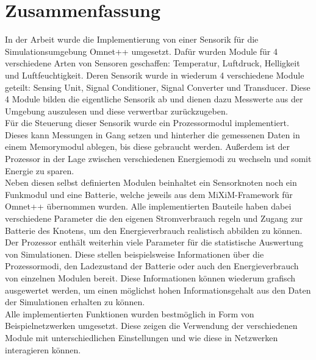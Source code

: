 \chapter{Zusammenfassung}

In der Arbeit wurde die Implementierung von einer Sensorik für die Simulationsumgebung Omnet++ umgesetzt. Dafür wurden Module für 4 verschiedene Arten von Sensoren geschaffen: Temperatur, Luftdruck, Helligkeit und Luftfeuchtigkeit. Deren Sensorik wurde in wiederum 4 verschiedene Module geteilt: Sensing Unit, Signal Conditioner, Signal Converter und Transducer. Diese 4 Module bilden die eigentliche Sensorik ab und dienen dazu Messwerte aus der Umgebung auszulesen und diese verwertbar zurückzugeben.\\
Für die Steuerung dieser Sensorik wurde ein Prozessormodul implementiert. Dieses kann Messungen in Gang setzen und hinterher die gemessenen Daten in einem Memorymodul ablegen, bis diese gebraucht werden. Außerdem ist der Prozessor in der Lage zwischen verschiedenen Energiemodi zu wechseln und somit Energie zu sparen.\\
Neben diesen selbst definierten Modulen beinhaltet ein Sensorknoten noch ein Funkmodul und eine Batterie, welche jeweils aus dem MiXiM-Framework für Omnet++ übernommen wurden. Alle implementierten Bauteile haben dabei verschiedene Parameter die den eigenen Stromverbrauch regeln und Zugang zur Batterie des Knotens, um den Energieverbrauch realistisch abbilden zu können.\\
Der Prozessor enthält weiterhin viele Parameter für die statistische Auswertung von Simulationen. Diese stellen beispielsweise Informationen über die Prozessormodi, den Ladezustand der Batterie oder auch den Energieverbrauch von einzelnen Modulen bereit. Diese Informationen können wiederum grafisch ausgewertet werden, um einen möglichst hohen Informationsgehalt aus den Daten der Simulationen erhalten zu können.\\
Alle implementierten Funktionen wurden bestmöglich in Form von Beispielnetzwerken umgesetzt. Diese zeigen die Verwendung der verschiedenen Module mit unterschiedlichen Einstellungen und wie diese in Netzwerken interagieren können.\\
